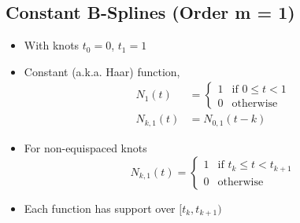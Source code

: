 \documentclass{article}
\begin{document}
\subsection*{Constant B-Splines (Order m = 1)}
\begin{itemize}
    \item With knots $t_0 = 0$, $t_1 = 1$
    \item Constant (a.k.a. Haar) function,
    \begin{align*}
        N_1(t) &= \begin{cases}1 & \text{if } 0 \leq t < 1 \\ 0 & \text{otherwise}\end{cases}\\
        N_{k, 1}(t) &= N_{0, 1}(t - k)
    \end{align*}
    \item For non-equispaced knots
    \[N_{k, 1}(t) = \begin{cases}1 & \text{if } t_k \leq t < t_{k + 1} \\ 0 & \text{otherwise}\end{cases}\]
    \item Each function has support over $[t_k, t_{k + 1})$
\end{itemize}
\end{document}
